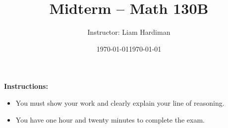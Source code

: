 \documentclass[11pt]{article}
\date{\today}
\title{Midterm -- Math 130B}
\author{Instructor: Liam Hardiman}
\date{\today}
\theoremstyle{plain}
\begin{document}
\maketitle


{\bf Instructions: } \begin{itemize} 
\item You must show your work and clearly
explain your line of reasoning.
\item You have one hour and twenty minutes to complete the exam.
\end{itemize}

\medskip
\medskip


\newpage
\end{document}
